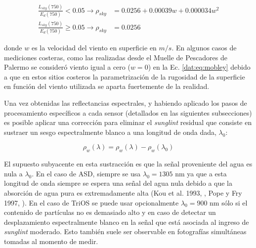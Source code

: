     \begin{equation}
    \begin{aligned}
        \frac{L_{sky}(750)}{E_{d}(750)} < 0.05 \rightarrow \rho_{sky} & = 0.0256 + 0.00039 w + 0.000034 w^{2}\\
        \frac{L_{sky}(750)}{E_{d}(750)} \geq 0.05 \rightarrow \rho_{sky} & = 0.0256
    \end{aligned}
    \label{dat:eq:mobley}
    \end{equation}
    
    \noindent
    donde $w$ es la velocidad del viento en superficie en $m/s$. En algunos casos de mediciones costeras, como las realizadas desde el Muelle de Pescadores de Palermo se consideró viento igual a cero ($w=0$) en la Ec. \ref{dat:eq:mobley} debido a que en estos sitios costeros la parametrización de la rugosidad de la superficie en función del viento utilizada se aparta fuertemente de la realidad.
    
    Una vez obtenidas las reflectancias espectrales, y habiendo aplicado los pasos de procesamiento específicos a cada sensor (detallados en las siguientes subsecciones) es posible aplicar una corrección para eliminar el \textit{sunglint} residual que consiste en sustraer un sesgo espectralmente blanco a una longitud de onda dada, $\lambda_{0}$:
    
    \begin{equation}                
        \rho_{w}(\lambda) = \rho_{w}(\lambda) - \rho_{w}(\lambda_{0})
    \end{equation}
    
    El supuesto subyacente en esta sustracción es que la señal proveniente del agua es nula a $\lambda_{0}$. En el caso de ASD, siempre se usa $\lambda_{0} = 1305$ nm ya que a esta longitud de onda siempre se espera una señal del agua nula debido a que la absorción de agua pura es extremadamente alta (Kou et al. 1993, \cite{kou1993}, Pope y Fry 1997, \cite{pope1997}). En el caso de TriOS se puede usar opcionalmente $\lambda_{0} = 900$ nm  sólo si el contenido de partículas no es demasiado alto y en caso de detectar un desplazamiento espectralmente blanco en la señal que está asociada al ingreso de \textit{sunglint} moderado. Esto también suele ser observable en fotografías simultáneas tomadas al momento de medir.

    

